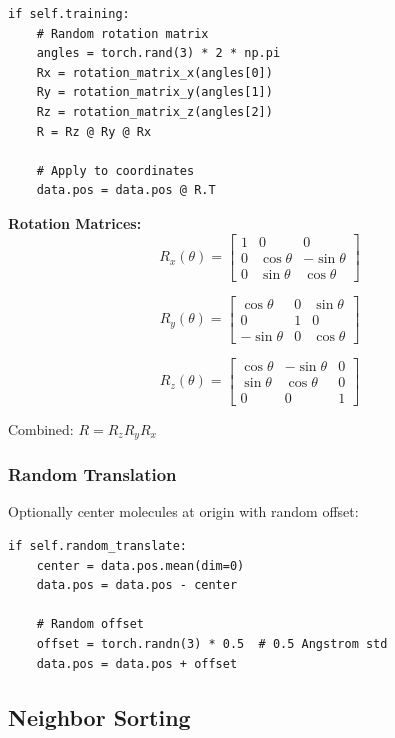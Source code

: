 \documentclass[11pt,a4paper]{article}
\begin{document}
\begin{lstlisting}
if self.training:
    # Random rotation matrix
    angles = torch.rand(3) * 2 * np.pi
    Rx = rotation_matrix_x(angles[0])
    Ry = rotation_matrix_y(angles[1])
    Rz = rotation_matrix_z(angles[2])
    R = Rz @ Ry @ Rx

    # Apply to coordinates
    data.pos = data.pos @ R.T
\end{lstlisting}

\textbf{Rotation Matrices:}
\begin{equation}
R_x(\theta) = \begin{bmatrix}
1 & 0 & 0 \\
0 & \cos\theta & -\sin\theta \\
0 & \sin\theta & \cos\theta
\end{bmatrix}
\end{equation}

\begin{equation}
R_y(\theta) = \begin{bmatrix}
\cos\theta & 0 & \sin\theta \\
0 & 1 & 0 \\
-\sin\theta & 0 & \cos\theta
\end{bmatrix}
\end{equation}

\begin{equation}
R_z(\theta) = \begin{bmatrix}
\cos\theta & -\sin\theta & 0 \\
\sin\theta & \cos\theta & 0 \\
0 & 0 & 1
\end{bmatrix}
\end{equation}

Combined: $R = R_z R_y R_x$

\subsubsection{Random Translation}

Optionally center molecules at origin with random offset:

\begin{lstlisting}
if self.random_translate:
    center = data.pos.mean(dim=0)
    data.pos = data.pos - center

    # Random offset
    offset = torch.randn(3) * 0.5  # 0.5 Angstrom std
    data.pos = data.pos + offset
\end{lstlisting}

\subsection{Neighbor Sorting}
\end{document}
